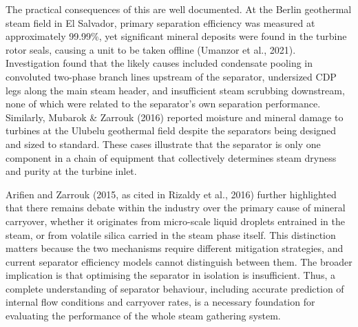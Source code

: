 The practical consequences of this are well documented. At the Berlin geothermal steam field in El Salvador, primary separation efficiency was measured at approximately 99.99\%, yet significant mineral deposits were found in the turbine rotor seals, causing a unit to be taken offline (Umanzor et al., 2021). Investigation found that the likely causes included condensate pooling in convoluted two-phase branch lines upstream of the separator, undersized CDP legs along the main steam header, and insufficient steam scrubbing downstream, none of which were related to the separator's own separation performance. Similarly, Mubarok \& Zarrouk (2016) reported moisture and mineral damage to turbines at the Ulubelu geothermal field despite the separators being designed and sized to standard. These cases illustrate that the separator is only one component in a chain of equipment that collectively determines steam dryness and purity at the turbine inlet.

Arifien and Zarrouk (2015, as cited in Rizaldy et al., 2016) further highlighted that there remains debate within the industry over the primary cause of mineral carryover, whether it originates from micro-scale liquid droplets entrained in the steam, or from volatile silica carried in the steam phase itself. This distinction matters because the two mechanisms require different mitigation strategies, and current separator efficiency models cannot distinguish between them. The broader implication is that optimising the separator in isolation is insufficient. Thus, a complete understanding of separator behaviour, including accurate prediction of internal flow conditions and carryover rates, is a necessary foundation for evaluating the performance of the whole steam gathering system.
